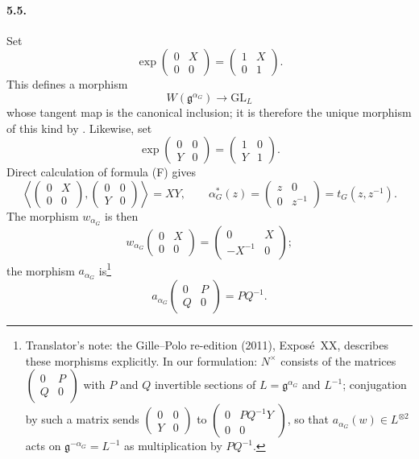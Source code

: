 \paragraph{\textbf{5.5.}}
Set
\[
 \exp\begin{pmatrix}0&X\\0&0\end{pmatrix}
   =\begin{pmatrix}1&X\\0&1\end{pmatrix}.
\]
This defines a morphism
\[
 W(\mathfrak g^{\alpha_G})\longrightarrow\mathrm{GL}_L
\]
whose tangent map is the canonical inclusion; it is therefore the
unique morphism of this kind by .  Likewise, set
\[
 \exp\begin{pmatrix}0&0\\Y&0\end{pmatrix}
   =\begin{pmatrix}1&0\\Y&1\end{pmatrix}.
\]
Direct calculation of formula \textup{(F)} gives
\[
 \left\langle
 \begin{pmatrix}0&X\\0&0\end{pmatrix},
 \begin{pmatrix}0&0\\Y&0\end{pmatrix}
 \right\rangle
 =XY,
 \qquad
 \alpha_G^\ast(z)
 =\begin{pmatrix}z&0\\0&z^{-1}\end{pmatrix}
 =t_G(z,z^{-1}).
\]
The morphism \(w_{\alpha_G}\) is then
\[
 w_{\alpha_G}\begin{pmatrix}0&X\\0&0\end{pmatrix}
 =\begin{pmatrix}0&X\\-X^{-1}&0\end{pmatrix};
\]
the morphism \(a_{\alpha_G}\) is\footnote{Translator's note: the Gille--Polo re-edition (2011), Exposé~XX, describes these morphisms explicitly. In
our formulation: \(N^\times\) consists of the matrices
\(\left(\begin{smallmatrix}0&P\\Q&0\end{smallmatrix}\right)\) with \(P\) and \(Q\) invertible
sections of \(L=\mathfrak g^{\alpha_G}\) and \(L^{-1}\); conjugation by such a matrix sends
\(\left(\begin{smallmatrix}0&0\\Y&0\end{smallmatrix}\right)\) to
\(\left(\begin{smallmatrix}0&PQ^{-1}Y\\0&0\end{smallmatrix}\right)\), so that
\(a_{\alpha_G}(w)\in L^{\otimes2}\) acts on \(\mathfrak g^{-\alpha_G}=L^{-1}\) as multiplication by
\(PQ^{-1}\).}
\[
 a_{\alpha_G}\begin{pmatrix}0&P\\Q&0\end{pmatrix}=PQ^{-1}.
\]

